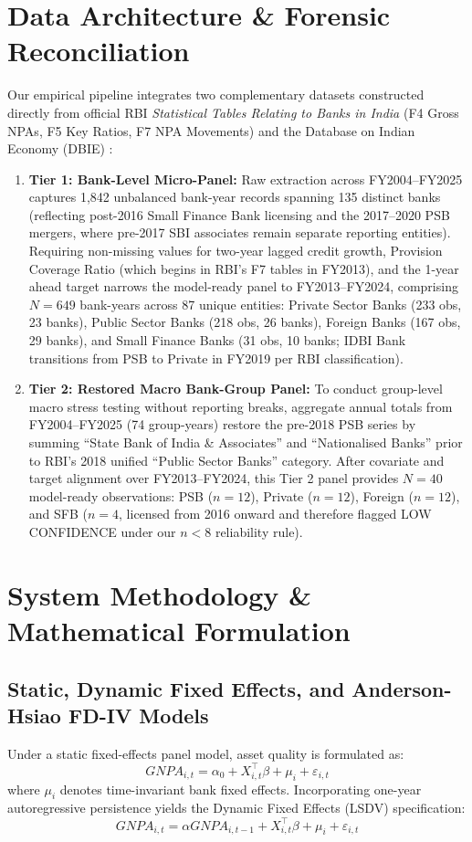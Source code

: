 \documentclass[conference]{IEEEtran}
\begin{document}
\section{Data Architecture \& Forensic Reconciliation}
Our empirical pipeline integrates two complementary datasets constructed directly from official RBI \emph{Statistical Tables Relating to Banks in India} (F4 Gross NPAs, F5 Key Ratios, F7 NPA Movements) and the Database on Indian Economy (DBIE) \cite{rbi_trend2024}:
\begin{enumerate}
    \item \textbf{Tier 1: Bank-Level Micro-Panel:} Raw extraction across FY2004--FY2025 captures 1,842 unbalanced bank-year records spanning 135 distinct banks (reflecting post-2016 Small Finance Bank licensing and the 2017--2020 PSB mergers, where pre-2017 SBI associates remain separate reporting entities). Requiring non-missing values for two-year lagged credit growth, Provision Coverage Ratio (which begins in RBI's F7 tables in FY2013), and the 1-year ahead target narrows the model-ready panel to FY2013--FY2024, comprising $N = 649$ bank-years across 87 unique entities: Private Sector Banks (233 obs, 23 banks), Public Sector Banks (218 obs, 26 banks), Foreign Banks (167 obs, 29 banks), and Small Finance Banks (31 obs, 10 banks; IDBI Bank transitions from PSB to Private in FY2019 per RBI classification).
    \item \textbf{Tier 2: Restored Macro Bank-Group Panel:} To conduct group-level macro stress testing without reporting breaks, aggregate annual totals from FY2004--FY2025 (74 group-years) restore the pre-2018 PSB series by summing ``State Bank of India \& Associates'' and ``Nationalised Banks'' prior to RBI's 2018 unified ``Public Sector Banks'' category. After covariate and target alignment over FY2013--FY2024, this Tier 2 panel provides $N = 40$ model-ready observations: PSB ($n = 12$), Private ($n = 12$), Foreign ($n = 12$), and SFB ($n = 4$, licensed from 2016 onward and therefore flagged LOW CONFIDENCE under our $n < 8$ reliability rule).
\end{enumerate}

\section{System Methodology \& Mathematical Formulation}
\subsection{Static, Dynamic Fixed Effects, and Anderson-Hsiao FD-IV Models}
Under a static fixed-effects panel model, asset quality is formulated as:
\begin{equation}
GNPA_{i,t} = \alpha_0 + X_{i,t}^\top \beta + \mu_i + \varepsilon_{i,t}
\end{equation}
where $\mu_i$ denotes time-invariant bank fixed effects. Incorporating one-year autoregressive persistence yields the Dynamic Fixed Effects (LSDV) specification:
\begin{equation}
GNPA_{i,t} = \alpha GNPA_{i,t-1} + X_{i,t}^\top \beta + \mu_i + \varepsilon_{i,t}
\end{equation}
\end{document}
